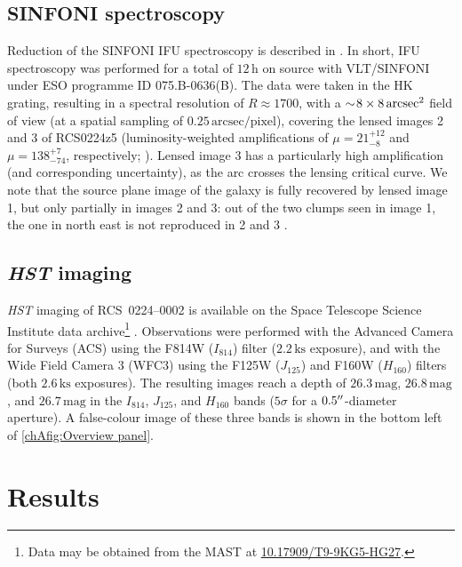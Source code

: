 \subsection{SINFONI spectroscopy}
\label{chAssec:Observations: SINFONI}

Reduction of the SINFONI IFU spectroscopy is described in \citet{2007MNRAS.376..479S}. In short, IFU spectroscopy was performed for a total of $12 \, \mathrm{h}$ on source with VLT/SINFONI \citep{2003SPIE.4841.1548E, 2004Msngr.117...17B} under ESO programme ID 075.B-0636(B). The data were taken in the HK grating, resulting in a spectral resolution of $R \approx 1700$, with a $\sim \! 8 \times 8 \, \mathrm{arcsec^2}$ field of view (at a spatial sampling of $0.25 \, \mathrm{arcsec/pixel}$), covering the lensed images 2 and 3 of RCS0224z5 (luminosity-weighted amplifications of $\mu = 21_{-8}^{+12}$ and $\mu = 138_{-74}^{+7}$, respectively; \citealt{2017MNRAS.467.3306S}). Lensed image 3 has a particularly high amplification (and corresponding uncertainty), as the arc crosses the lensing critical curve. We note that the source plane image of the galaxy is fully recovered by lensed image 1, but only partially in images 2 and 3: out of the two clumps seen in image 1, the one in north east is not reproduced in 2 and 3 \citep[see][ for details]{2017MNRAS.467.3306S}.

\subsection{\textit{HST} imaging}
\label{chAssec:Observations: HST}

\textit{HST} imaging of RCS~0224--0002 is available on the Space Telescope Science Institute data archive\footnote{Data may be obtained from the MAST at \href{https://dx.doi.org/10.17909/t9-9kg5-hg27}{10.17909/T9-9KG5-HG27}.} \citep[GO 14497, PI: Smit; see][]{2017MNRAS.467.3306S}. Observations were performed with the Advanced Camera for Surveys (ACS) using the F814W ($I_{814}$) filter ($2.2 \, \mathrm{ks}$ exposure), and with the Wide Field Camera 3 (WFC3) using the F125W ($J_{125}$) and F160W ($H_{160}$) filters (both $2.6 \, \mathrm{ks}$ exposures). The resulting images reach a depth of $26.3 \, \mathrm{mag}$, $26.8 \, \mathrm{mag}$, and $26.7 \, \mathrm{mag}$ in the $I_{814}$, $J_{125}$, and $H_{160}$ bands ($5\sigma$ for a $0.5 \hbox{$^{\prime\prime}$}$-diameter aperture). A false-colour image of these three bands is shown in the bottom left of \cref{chAfig:Overview panel}.

\section{Results}
\label{chAsec:Results}

